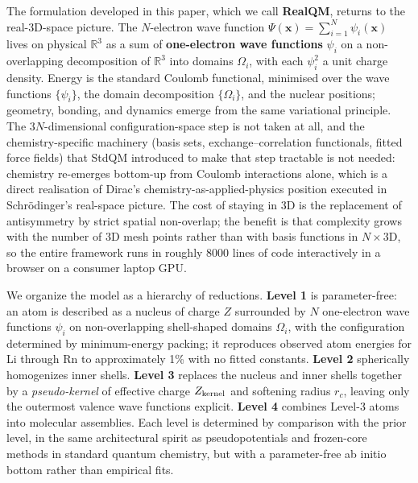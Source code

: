 \documentclass[11pt]{article}
\begin{document}
The formulation developed in this paper, which we call \textbf{RealQM}, returns to the real-3D-space picture. The $N$-electron wave function $\Psi(\mathbf{x}) = \sum_{i=1}^N \psi_i(\mathbf{x})$ lives on physical $\mathbb{R}^3$ as a sum of \textbf{one-electron wave functions} $\psi_i$ on a non-overlapping decomposition of $\mathbb{R}^3$ into domains $\Omega_i$, with each $\psi_i^2$ a unit charge density. Energy is the standard Coulomb functional, minimised over the wave functions $\{\psi_i\}$, the domain decomposition $\{\Omega_i\}$, and the nuclear positions; geometry, bonding, and dynamics emerge from the same variational principle. The $3N$-dimensional configuration-space step is not taken at all, and the chemistry-specific machinery (basis sets, exchange--correlation functionals, fitted force fields) that StdQM introduced to make that step tractable is not needed: chemistry re-emerges bottom-up from Coulomb interactions alone, which is a direct realisation of Dirac's chemistry-as-applied-physics position executed in Schr\"odinger's real-space picture. The cost of staying in 3D is the replacement of antisymmetry by strict spatial non-overlap; the benefit is that complexity grows with the number of 3D mesh points rather than with basis functions in $N\times 3$D, so the entire framework runs in roughly 8000 lines of code interactively in a browser on a consumer laptop GPU.

We organize the model as a hierarchy of reductions. \textbf{Level 1} is parameter-free: an atom is described as a nucleus of charge $Z$ surrounded by $N$ one-electron wave functions $\psi_i$ on non-overlapping shell-shaped domains $\Omega_i$, with the configuration determined by minimum-energy packing; it reproduces observed atom energies for Li through Rn to approximately 1\% with no fitted constants. \textbf{Level 2} spherically homogenizes inner shells. \textbf{Level 3} replaces the nucleus and inner shells together by a \emph{pseudo-kernel} of effective charge $Z_{\rm kernel}$ and softening radius $r_c$, leaving only the outermost valence wave functions explicit. \textbf{Level 4} combines Level-3 atoms into molecular assemblies. Each level is determined by comparison with the prior level, in the same architectural spirit as pseudopotentials and frozen-core methods in standard quantum chemistry, but with a parameter-free ab initio bottom rather than empirical fits.
\end{document}
